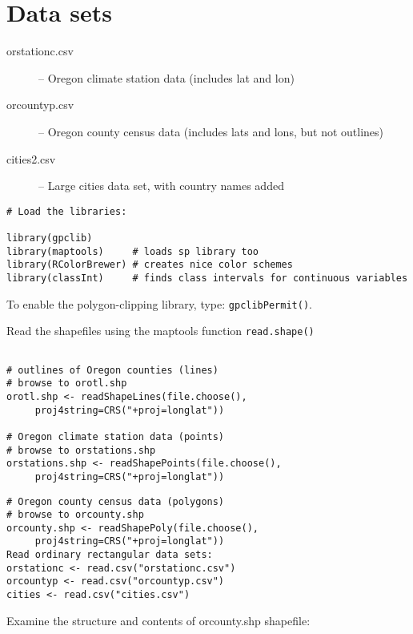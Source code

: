 \documentclass[12pt]{report}
\begin{document}
\section*{Data sets}
\begin{description}
\item[orstationc.csv] -- Oregon climate station data (includes lat and lon)
\item[orcountyp.csv] -- Oregon county census data (includes lats and lons, but not outlines)
\item[cities2.csv] -- Large cities data set, 
    with country names added
\end{description}

\begin{framed}
\begin{verbatim}
# Load the libraries:

library(gpclib)
library(maptools)     # loads sp library too
library(RColorBrewer) # creates nice color schemes
library(classInt)     # finds class intervals for continuous variables
\end{verbatim}
\end{framed}
To enable the polygon-clipping library, type:
\texttt{gpclibPermit()}.


Read the shapefiles using the maptools function \texttt{read.shape()}
\begin{framed}
\begin{verbatim}

# outlines of Oregon counties (lines)
# browse to orotl.shp
orotl.shp <- readShapeLines(file.choose(),
     proj4string=CRS("+proj=longlat"))

# Oregon climate station data (points)
# browse to orstations.shp
orstations.shp <- readShapePoints(file.choose(),
     proj4string=CRS("+proj=longlat"))
\end{verbatim}
\end{framed}
     
\begin{framed}
\begin{verbatim}
# Oregon county census data (polygons)
# browse to orcounty.shp
orcounty.shp <- readShapePoly(file.choose(),
     proj4string=CRS("+proj=longlat"))
Read ordinary rectangular data sets:
orstationc <- read.csv("orstationc.csv")
orcountyp <- read.csv("orcountyp.csv")
cities <- read.csv("cities.csv")
\end{verbatim}
\end{framed}
Examine the structure and contents of orcounty.shp shapefile:
\end{document}
